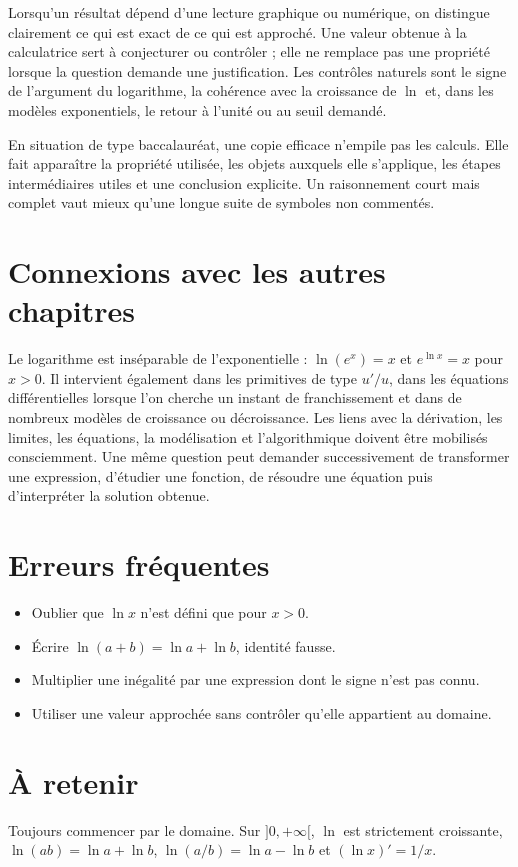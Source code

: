 Lorsqu’un résultat dépend d’une lecture graphique ou numérique, on distingue clairement ce qui est exact de ce qui est approché. Une valeur obtenue à la calculatrice sert à conjecturer ou contrôler ; elle ne remplace pas une propriété lorsque la question demande une justification. Les contrôles naturels sont le signe de l’argument du logarithme, la cohérence avec la croissance de $\ln$ et, dans les modèles exponentiels, le retour à l’unité ou au seuil demandé.

En situation de type baccalauréat, une copie efficace n’empile pas les calculs. Elle fait apparaître la propriété utilisée, les objets auxquels elle s’applique, les étapes intermédiaires utiles et une conclusion explicite. Un raisonnement court mais complet vaut mieux qu’une longue suite de symboles non commentés.

\section{Connexions avec les autres chapitres}
Le logarithme est inséparable de l’exponentielle : $\ln(e^x)=x$ et $e^{\ln x}=x$ pour $x>0$. Il intervient également dans les primitives de type $u'/u$, dans les équations différentielles lorsque l’on cherche un instant de franchissement et dans de nombreux modèles de croissance ou décroissance.
Les liens avec la dérivation, les limites, les équations, la modélisation et l’algorithmique doivent être mobilisés consciemment. Une même question peut demander successivement de transformer une expression, d’étudier une fonction, de résoudre une équation puis d’interpréter la solution obtenue.

\section{Erreurs fréquentes}
\begin{itemize}
\item Oublier que $\ln x$ n’est défini que pour $x>0$.
\item Écrire $\ln(a+b)=\ln a+\ln b$, identité fausse.
\item Multiplier une inégalité par une expression dont le signe n’est pas connu.
\item Utiliser une valeur approchée sans contrôler qu’elle appartient au domaine.
\end{itemize}

\section{À retenir}
\begin{aretenir}
Toujours commencer par le domaine. Sur $]0,+\infty[$, $\ln$ est strictement croissante, $\ln(ab)=\ln a+\ln b$, $\ln(a/b)=\ln a-\ln b$ et $(\ln x)'=1/x$.
\end{aretenir}
